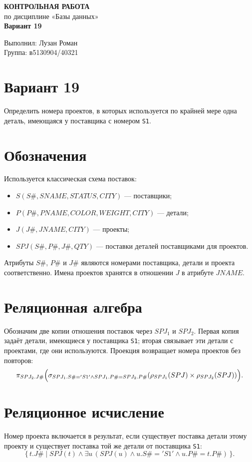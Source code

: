 \documentclass[12pt,a4paper]{article}
\begin{document}
\begin{center}
  \textbf{КОНТРОЛЬНАЯ РАБОТА}\\[0.5em]
  по дисциплине «Базы данных»\\[1em]
  \textbf{Вариант 19}
\end{center}

\vspace{1em}
\noindent Выполнил: Лузан Роман\\[0.8em]
\noindent Группа: в5130904/40321

\section*{Вариант 19}
Определить номера проектов, в которых используется по крайней мере одна деталь, имеющаяся у поставщика с номером \texttt{S1}.

\section*{Обозначения}
Используется классическая схема поставок:
\begin{itemize}
  \item $S(S\#, SNAME, STATUS, CITY)$ --- поставщики;
  \item $P(P\#, PNAME, COLOR, WEIGHT, CITY)$ --- детали;
  \item $J(J\#, JNAME, CITY)$ --- проекты;
  \item $SPJ(S\#, P\#, J\#, QTY)$ --- поставки деталей поставщиками для проектов.
\end{itemize}
Атрибуты $S\#$, $P\#$ и $J\#$ являются номерами поставщика, детали и проекта соответственно. Имена проектов хранятся в отношении $J$ в атрибуте $JNAME$.

\section*{Реляционная алгебра}
Обозначим две копии отношения поставок через $SPJ_1$ и $SPJ_2$. Первая копия задаёт детали, имеющиеся у поставщика \texttt{S1}; вторая связывает эти детали с проектами, где они используются. Проекция возвращает номера проектов без повторов:
\[
\pi_{SPJ_2.J\#}\Bigl(\sigma_{SPJ_1.S\#='S1' \land SPJ_1.P\#=SPJ_2.P\#}(\rho_{SPJ_1}(SPJ) \times \rho_{SPJ_2}(SPJ))\Bigr).
\]

\section*{Реляционное исчисление}
Номер проекта включается в результат, если существует поставка детали этому проекту и существует поставка той же детали от поставщика \texttt{S1}:
\[
\{\, t.J\# \mid SPJ(t) \land \exists u\,(SPJ(u) \land u.S\#='S1' \land u.P\#=t.P\#)\,\}.
\]
\end{document}
